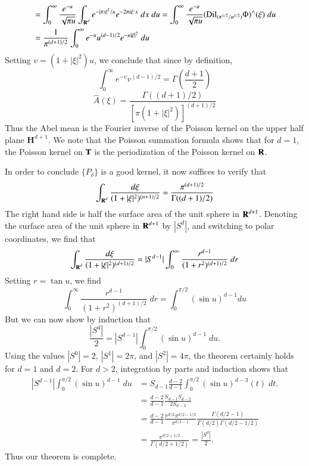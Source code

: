\begin{example}
\begin{align*}
        &= \int_0^\infty \frac{e^{-u}}{\sqrt{\pi u}} \int_{\operatorname{\mathbf{R}}^d} e^{-|\pi x|^2/u} e^{-2 \pi i \xi \cdot x}\; dx\; du = \int_0^\infty \frac{e^{-u}}{\sqrt{\pi u}} (\text{Dil}_{(\pi^{1/2}/u^{1/2})} \Phi)^\wedge(\xi)\; du\\
        &= \frac{1}{\pi^{(d + 1)/2}} \int_0^\infty e^{-u} u^{(d-1)/2} e^{- u|\xi|^2}\; du
    \end{align*}
    Setting $v = (1 + |\xi|^2) u$, we conclude that since by definition,
    \[ \int_0^\infty e^{-v} v^{(d-1)/2} = \Gamma \left( \frac{d+1}{2} \right) \]
    \[ \widehat{A}(\xi) = \frac{\Gamma((d+1)/2)}{[\pi(1 + |\xi|^2)]^{(d+1)/2}} \]
    Thus the Abel mean is the Fourier inverse of the Poisson kernel on the upper half plane $\mathbf{H}^{d+1}$. We note that the Poisson summation formula shows that for $d = 1$, the Poisson kernel on $\operatorname{\mathbf{T}}$ is the periodization of the Poisson kernel on $\operatorname{\mathbf{R}}$.

    In order to conclude $\{ P_\delta \}$ is a good kernel, it now suffices to verify that
    \[ \int_{\operatorname{\mathbf{R}}^d} \frac{d\xi}{(1 + |\xi|^2)^{(n+1)/2}} = \frac{\pi^{(d+1)/2}}{\Gamma((d+1)/2)} \]
    The right hand side is half the surface area of the unit sphere in $\operatorname{\mathbf{R}}^{d+1}$. Denoting the surface area of the unit sphere in $\operatorname{\mathbf{R}}^{d+1}$ by $|S^d|$, and switching to polar coordinates, we find that
    \[ \int_{\operatorname{\mathbf{R}}^d} \frac{d\xi}{(1 + |\xi|^2)^{(d+1)/2}} = |S^{d-1}| \int_0^\infty \frac{r^{d-1}}{(1 + r^2)^{(d+1)/2}}\; dr \]
    Setting $r = \tan u$, we find
    \[ \int_0^\infty \frac{r^{d-1}}{(1 + r^2)^{(d+1)/2}}\; dr = \int_0^{\pi/2} (\sin u)^{d-1} du \]
    But we can now show by induction that
    \[ \frac{|S^d|}{2} = |S^{d-1}| \int_0^{\pi/2} (\sin u)^{d-1}\; du. \]
    Using the values $|S^0| = 2$, $|S^1| = 2\pi$, and $|S^2| = 4\pi$, the theorem certainly holds for $d = 1$ and $d = 2$. For $d > 2$, integration by parts and induction shows that
    \begin{align*}
        |S^{d-1}| \int_0^{\pi/2} (\sin u)^{d-1}\; du &= S_{d-1} \frac{d-2}{d-1} \int_0^{\pi/2} (\sin u)^{d-3}(t)\; dt.\\
        &= \frac{d-2}{d-1} \frac{S_{d-1} S_{d-2}}{2S_{d-3}}\\
        &= \frac{d-2}{d-1} \frac{\pi^{d/2} \pi^{d/2-1/2}}{\pi^{d/2-1}} \frac{\Gamma(d/2 - 1)}{\Gamma(d/2) \Gamma(d/2 - 1/2)}\\
        &= \frac{\pi^{d/2+1/2}}{\Gamma(d/2 + 1/2)} = \frac{|S^d|}{2}.
    \end{align*}
    Thus our theorem is complete.
\end{example}

